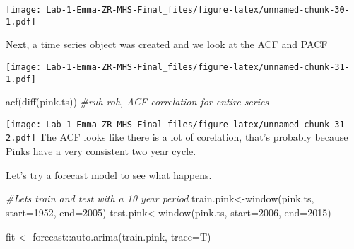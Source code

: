 \documentclass[
]{article}
\newenvironment{Shaded}{\begin{snugshade}}{\end{snugshade}}
\newcommand{\AttributeTok}[1]{\textcolor[rgb]{0.77,0.63,0.00}{#1}}
\newcommand{\CommentTok}[1]{\textcolor[rgb]{0.56,0.35,0.01}{\textit{#1}}}
\newcommand{\DecValTok}[1]{\textcolor[rgb]{0.00,0.00,0.81}{#1}}
\newcommand{\FunctionTok}[1]{\textcolor[rgb]{0.00,0.00,0.00}{#1}}
\newcommand{\NormalTok}[1]{#1}
\newcommand{\OtherTok}[1]{\textcolor[rgb]{0.56,0.35,0.01}{#1}}
\newcommand{\SpecialCharTok}[1]{\textcolor[rgb]{0.00,0.00,0.00}{#1}}
\begin{document}
\texttt{[image: Lab-1-Emma-ZR-MHS-Final\_files/figure-latex/unnamed-chunk-30-1.pdf]}

Next, a time series object was created and we look at the ACF and PACF

\begin{Shaded}
\end{Shaded}

\texttt{[image: Lab-1-Emma-ZR-MHS-Final\_files/figure-latex/unnamed-chunk-31-1.pdf]}

\begin{Shaded}
\begin{Highlighting}[]
\FunctionTok{acf}\NormalTok{(}\FunctionTok{diff}\NormalTok{(pink.ts)) }\CommentTok{\#ruh roh, ACF correlation for entire series }
\end{Highlighting}
\end{Shaded}

\texttt{[image: Lab-1-Emma-ZR-MHS-Final\_files/figure-latex/unnamed-chunk-31-2.pdf]}
The ACF looks like there is a lot of corelation, that's probably because
Pinks have a very consistent two year cycle.

Let's try a forecast model to see what happens.

\begin{Shaded}
\begin{Highlighting}[]
\CommentTok{\#Let\textquotesingle{}s train and test with a 10 year period}
\NormalTok{train.pink}\OtherTok{\textless{}{-}}\FunctionTok{window}\NormalTok{(pink.ts, }\AttributeTok{start=}\DecValTok{1952}\NormalTok{, }\AttributeTok{end=}\DecValTok{2005}\NormalTok{)}
\NormalTok{test.pink}\OtherTok{\textless{}{-}}\FunctionTok{window}\NormalTok{(pink.ts, }\AttributeTok{start=}\DecValTok{2006}\NormalTok{, }\AttributeTok{end=}\DecValTok{2015}\NormalTok{)}

\NormalTok{fit }\OtherTok{\textless{}{-}}\NormalTok{ forecast}\SpecialCharTok{::}\FunctionTok{auto.arima}\NormalTok{(train.pink, }\AttributeTok{trace=}\NormalTok{T)}
\end{Highlighting}
\end{Shaded}
\end{document}
